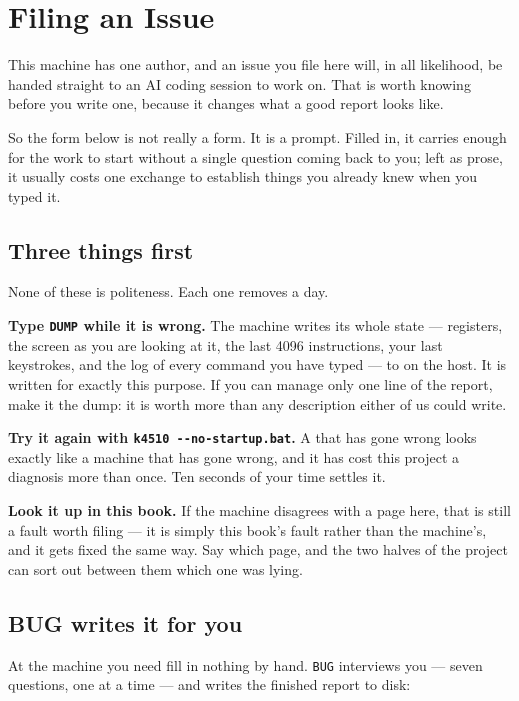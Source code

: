 \chapter{Filing an Issue}\label{cha:issues}

This machine has one author, and an issue you file here will, in all
likelihood, be handed straight to an AI coding session to work on. That
is worth knowing before you write one, because it changes what a good
report looks like.

So the form below is not really a form. It is a prompt. Filled in, it
carries enough for the work to start without a single question coming
back to you; left as prose, it usually costs one exchange to establish
things you already knew when you typed it.

\section{Three things first}
None of these is politeness. Each one removes a day.

\textbf{Type \texttt{DUMP} while it is wrong.} The machine writes its whole
state --- registers, the screen as you are looking at it, the last 4096
instructions, your last keystrokes, and the log of every command you have
typed --- to  on the host. It is written for
exactly this purpose. If you can manage only one line of the report, make
it the dump: it is worth more than any description either of us could
write.

\textbf{Try it again with \texttt{k4510 {-}{-}no-startup.bat}.} A
 that has gone wrong looks exactly like a machine that
has gone wrong, and it has cost this project a diagnosis more than once.
Ten seconds of your time settles it.

\textbf{Look it up in this book.} If the machine disagrees with a page
here, that is still a fault worth filing --- it is simply this book's
fault rather than the machine's, and it gets fixed the same way. Say
which page, and the two halves of the project can sort out between them
which one was lying.

\section{BUG writes it for you}
At the machine you need fill in nothing by hand. \verb|BUG| interviews
you --- seven questions, one at a time --- and writes the finished report
to disk:


